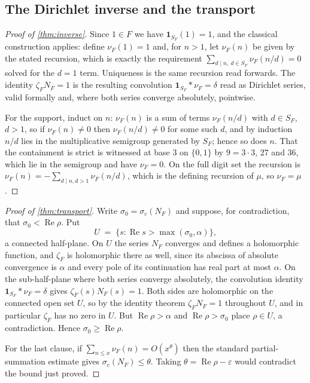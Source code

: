 \documentclass[11pt]{amsart}
\theoremstyle{definition}
\theoremstyle{remark}
\begin{document}
\subsection{The Dirichlet inverse and the transport}
\label{sub:proof-inverse}

\begin{proof}[Proof of \cref{thm:inverse}]
Since $1 \in F$ we have $\mathbf{1}_{S_{F}}(1) = 1$, and the classical construction applies: define $\nu_{F}(1) = 1$ and, for $n > 1$, let $\nu_{F}(n)$ be given by the stated recursion, which is exactly the requirement $\sum_{d \mid n,\ d \in S_{F}} \nu_{F}(n/d) = 0$ solved for the $d = 1$ term. Uniqueness is the same recursion read forwards. The identity $\zeta_{F}N_{F} = 1$ is the resulting convolution $\mathbf{1}_{S_{F}} * \nu_{F} = \delta$ read as Dirichlet series, valid formally and, where both series converge absolutely, pointwise.

For the support, induct on $n$: $\nu_{F}(n)$ is a sum of terms $\nu_{F}(n/d)$ with $d \in S_{F}$, $d > 1$, so if $\nu_{F}(n) \ne 0$ then $\nu_{F}(n/d) \ne 0$ for some such $d$, and by induction $n/d$ lies in the multiplicative semigroup generated by $S_{F}$; hence so does $n$. That the containment is strict is witnessed at base $3$ on $\{0,1\}$ by $9 = 3 \cdot 3$, $27$ and $36$, which lie in the semigroup and have $\nu_{F} = 0$. On the full digit set the recursion is $\nu_{F}(n) = -\sum_{d \mid n, d > 1} \nu_{F}(n/d)$, which is the defining recursion of $\mu$, so $\nu_{F} = \mu$.
\end{proof}

\begin{proof}[Proof of \cref{thm:transport}]
Write $\sigma_{0} = \sigma_{c}(N_{F})$ and suppose, for contradiction, that $\sigma_{0} < \operatorname{Re}\rho$. Put
\[
  U \;=\; \{s : \operatorname{Re} s > \max(\sigma_{0}, \alpha)\},
\]
a connected half-plane. On $U$ the series $N_{F}$ converges and defines a holomorphic function, and $\zeta_{F}$ is holomorphic there as well, since its abscissa of absolute convergence is $\alpha$ and every pole of its continuation has real part at most $\alpha$. On the sub-half-plane where both series converge absolutely, the convolution identity $\mathbf{1}_{S_{F}} * \nu_{F} = \delta$ gives $\zeta_{F}(s)N_{F}(s) = 1$. Both sides are holomorphic on the connected open set $U$, so by the identity theorem $\zeta_{F}N_{F} = 1$ throughout $U$, and in particular $\zeta_{F}$ has no zero in $U$. But $\operatorname{Re}\rho > \alpha$ and $\operatorname{Re}\rho > \sigma_{0}$ place $\rho \in U$, a contradiction. Hence $\sigma_{0} \ge \operatorname{Re}\rho$.

For the last clause, if $\sum_{n \le x}\nu_{F}(n) = O(x^{\theta})$ then the standard partial-summation estimate gives $\sigma_{c}(N_{F}) \le \theta$. Taking $\theta = \operatorname{Re}\rho - \varepsilon$ would contradict the bound just proved.
\end{proof}
\end{document}
